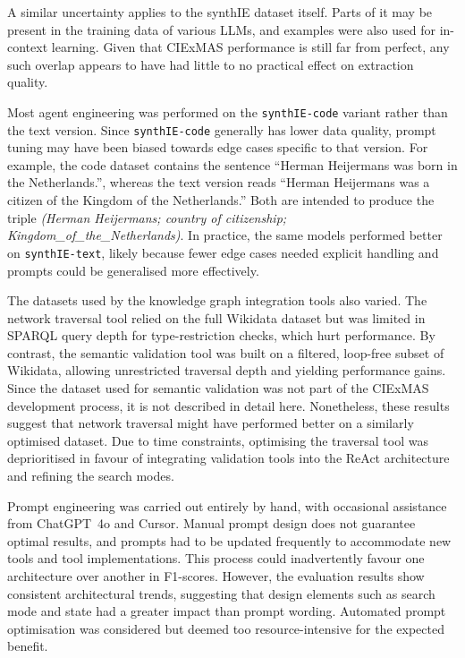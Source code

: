 \documentclass[a4paper,oneside,bibliography=totoc]{scrbook}
\begin{document}
A similar uncertainty applies to the synthIE dataset itself. Parts of it may be present in the training data of various \acp{LLM}, and examples were also used for in-context learning. Given that CIExMAS performance is still far from perfect, any such overlap appears to have had little to no practical effect on extraction quality.

Most agent engineering was performed on the \texttt{synthIE-code} variant rather than the text version. Since \texttt{synthIE-code} generally has lower data quality, prompt tuning may have been biased towards edge cases specific to that version. For example, the code dataset contains the sentence \enquote{Herman Heijermans was born in the Netherlands.}, whereas the text version reads \enquote{Herman Heijermans was a citizen of the Kingdom of the Netherlands.} Both are intended to produce the triple \textit{(Herman Heijermans; country of citizenship; Kingdom\_of\_the\_Netherlands)}. In practice, the same models performed better on \texttt{synthIE-text}, likely because fewer edge cases needed explicit handling and prompts could be generalised more effectively.

The datasets used by the knowledge graph integration tools also varied. The network traversal tool relied on the full Wikidata dataset but was limited in \ac{SPARQL} query depth for type-restriction checks, which hurt performance. By contrast, the semantic validation tool was built on a filtered, loop-free subset of Wikidata, allowing unrestricted traversal depth and yielding performance gains. Since the dataset used for semantic validation was not part of the CIExMAS development process, it is not described in detail here. Nonetheless, these results suggest that network traversal might have performed better on a similarly optimised dataset. Due to time constraints, optimising the traversal tool was deprioritised in favour of integrating validation tools into the ReAct architecture and refining the search modes.

Prompt engineering was carried out entirely by hand, with occasional assistance from ChatGPT~4o and Cursor. Manual prompt design does not guarantee optimal results, and prompts had to be updated frequently to accommodate new tools and tool implementations. This process could inadvertently favour one architecture over another in F1-scores. However, the evaluation results show consistent architectural trends, suggesting that design elements such as search mode and state had a greater impact than prompt wording. Automated prompt optimisation was considered but deemed too resource-intensive for the expected benefit.
\end{document}
